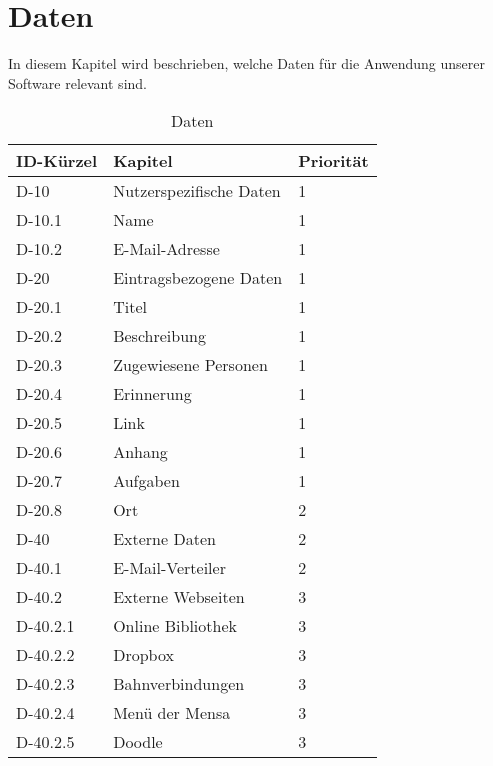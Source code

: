 
\chapter{Daten}

In diesem Kapitel wird beschrieben, welche Daten für die Anwendung unserer Software relevant sind.\\

\begin{table}[H]
    \caption{Daten}
    \label{einleitung:kapitel}
    \begin{tabularx}{\textwidth}{|l|X|l|}
        \toprule
        \textbf{ID-Kürzel} & \textbf{Kapitel} & \textbf{Priorität}\\
        \endhead
        \hline
        D-10 & Nutzerspezifische Daten & 1\\
        D-10.1 & Name &1\\
        D-10.2 & E-Mail-Adresse &1 \\       
        \hline
        D-20 & Eintragsbezogene Daten & 1\\
        D-20.1 & Titel &1\\
        D-20.2 & Beschreibung & 1\\
        D-20.3 & Zugewiesene Personen & 1\\
        D-20.4 & Erinnerung &1\\
        D-20.5 & Link &1\\
        D-20.6 & Anhang &1\\
        D-20.7 & Aufgaben & 1\\
        D-20.8 & Ort &  2\\
        \hline
        D-40 & Externe Daten & 2\\
        D-40.1 & E-Mail-Verteiler & 2\\
        D-40.2 & Externe Webseiten & 3 \\
        D-40.2.1 & Online Bibliothek & 3\\
        D-40.2.2 & Dropbox & 3 \\
        D-40.2.3 & Bahnverbindungen & 3\\
        D-40.2.4 & Menü der Mensa & 3\\
        D-40.2.5 & Doodle & 3\\        
        \hline
    \end{tabularx}
\end{table}


